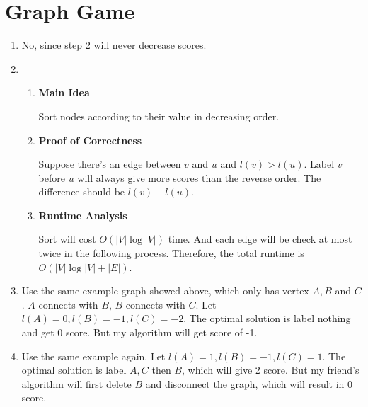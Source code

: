 \documentclass[11pt]{article}
\newenvironment{qparts}{\begin{enumerate}[{(}a{)}]}{\end{enumerate}}
\begin{document}
\newpage
\section{Graph Game}
\begin{qparts}

	\item No, since step 2 will never decrease scores.
	
	\item 
	
	\renewcommand{\theenumii}{\roman{enumii}}
	\begin{enumerate}
		\item \textbf{Main Idea}
		
		Sort nodes according to their value in decreasing order.
				
		\item \textbf{Proof of Correctness}
		
		Suppose there's an edge between $v$ and $u$ and $l(v) > l(u)$. Label $v$ before $u$ will always give more scores than the reverse order. The difference should be $l(v) - l(u)$.

		\item \textbf{Runtime Analysis}
		
		Sort will cost $O(|V| \log |V|)$ time. And each edge will be check at most twice in the following process. Therefore, the total runtime is $O(|V|\log |V| + |E|)$.
				
	\end{enumerate}
	
	\item Use the same example graph showed above, which only has vertex $A, B$ and $C$. $A$ connects with $B$, $B$ connects with $C$. Let $l(A) = 0, l(B) = -1, l(C) = -2$. The optimal solution is label nothing and get 0 score. But my algorithm will get score of -1.
	
	\item Use the same example again. Let $l(A) = 1, l(B) = -1, l(C) = 1$. The optimal solution is label $A, C$ then $B$, which will give 2 score. But my friend's algorithm will first delete $B$ and disconnect the graph, which will result in 0 score.
	


\end{qparts}


\newpage
\end{document}
